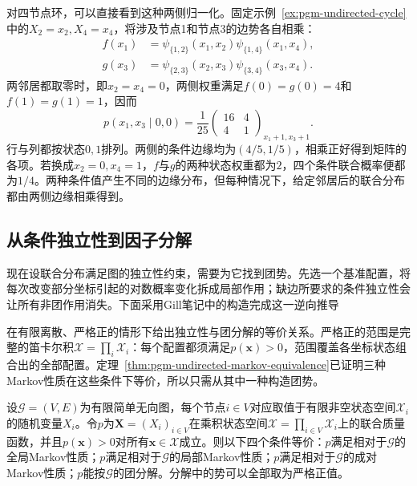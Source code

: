 对四节点环，可以直接看到这种两侧归一化。固定示例~\ref{ex:pgm-undirected-cycle}中的$X_2=x_2,X_4=x_4$，将涉及节点1和节点3的边势各自相乘：
\[
  \begin{aligned}
    f(x_1)&=\psi_{\{1,2\}}(x_1,x_2)\psi_{\{1,4\}}(x_1,x_4),\\
    g(x_3)&=\psi_{\{2,3\}}(x_2,x_3)\psi_{\{3,4\}}(x_3,x_4).
  \end{aligned}
\]
两邻居都取零时，即$x_2=x_4=0$，两侧权重满足$f(0)=g(0)=4$和$f(1)=g(1)=1$，因而
\[
  p(x_1,x_3\mid0,0)
  =\frac{1}{25}
    \begin{pmatrix}16&4\\4&1\end{pmatrix}_{x_1+1,x_3+1}.
\]
行与列都按状态$0,1$排列。两侧的条件边缘均为$(4/5,1/5)$，相乘正好得到矩阵的各项。若换成$x_2=0,x_4=1$，$f$与$g$的两种状态权重都为$2$，四个条件联合概率便都为$1/4$。两种条件值产生不同的边缘分布，但每种情况下，给定邻居后的联合分布都由两侧边缘相乘得到。

\subsection{从条件独立性到因子分解}
\label{sec:pgm-undirected-hammersley-clifford}

现在设联合分布满足图的独立性约束，需要为它找到团势。先选一个基准配置，将每次改变部分坐标引起的对数概率变化拆成局部作用；缺边所要求的条件独立性会让所有非团作用消失。下面采用Gill笔记中的构造完成这一逆向推导

在有限离散、严格正的情形下给出独立性与团分解的等价关系。严格正的范围是完整的笛卡尔积$\mathcal{X}=\prod_i\mathcal{X}_i$：每个配置都须满足$p(\bm{x})>0$，范围覆盖各坐标状态组合出的全部配置。定理~\ref{thm:pgm-undirected-markov-equivalence}已证明三种Markov性质在这些条件下等价，所以只需从其中一种构造团势。

\begin{theorem}
  \label{thm:pgm-undirected-hammersley-clifford}
  设$\mathcal{G}=(V,E)$为有限简单无向图，每个节点$i\in V$对应取值于有限非空状态空间$\mathcal{X}_i$的随机变量$X_i$。令$p$为$\bm{X}=(X_i)_{i\in V}$在乘积状态空间$\mathcal{X}=\prod_{i\in V}\mathcal{X}_i$上的联合质量函数，并且$p(\bm{x})>0$对所有$\bm{x}\in\mathcal{X}$成立。则以下四个条件等价：$p$满足相对于$\mathcal{G}$的全局Markov性质；$p$满足相对于$\mathcal{G}$的局部Markov性质；$p$满足相对于$\mathcal{G}$的成对Markov性质；$p$能按$\mathcal{G}$的团分解。分解中的势可以全部取为严格正值。
\end{theorem}

